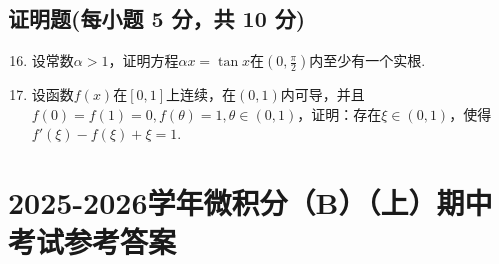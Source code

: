 \documentclass[../main.tex]{subfiles}
\begin{document}
\section{证明题(每小题 5 分，共 10 分)}
\begin{enumerate}
    \setcounter{enumi}{15}
    \item 设常数$\alpha>1$，证明方程$\alpha x=\tan x$在$\left(0,\frac{\pi}{2}
              \right)$内至少有一个实根.
          \vspace{10em}

    \item 设函数$f(x)$在$[0,1]$上连续，在$(0,1)$内可导，并且$f(0)=f(1)=0,f(\theta
              )=1,\theta\in(0,1)$，证明：存在$\xi\in(0,1)$，使得$f'(\xi)-f(\xi)+\xi=1$.
          \vspace{8em}
\end{enumerate}

\chapter{2025-2026学年微积分（B）（上）期中考试参考答案}
\end{document}
